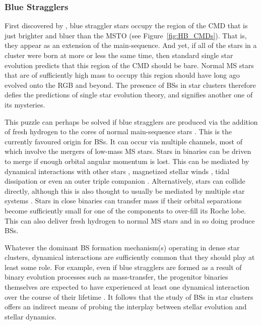\subsubsection{Blue Stragglers} \label{BSs}

First discovered by \citet{sandage53}, blue straggler stars occupy the
region of the CMD that is just brighter and bluer than the MSTO (see
Figure~\ref{fig:HB_CMDs}).  That
is, they appear as an extension of the main-sequence.  And yet, if all
of the stars in a cluster were born at more or less the same time,
then standard single star evolution predicts that this region
of the CMD should be bare.  Normal MS stars that are of sufficiently
high mass to occupy this region should have long ago evolved onto the
RGB and beyond.  The presence of BSs in star clusters therefore
defies the predictions of single star evolution theory, and signifies 
another one of its mysteries.

This puzzle can perhaps be solved if blue stragglers are produced 
via the addition of fresh hydrogen to the cores of normal 
main-sequence stars \citep[e.g.][]{sills01}.  This is the
currently favoured origin for BSs.  It can occur
via multiple channels, most of which involve the mergers of low-mass
MS stars.  Stars in binaries can be driven to merge if enough orbital
angular momentum is lost.  This can be
mediated by dynamical interactions with other stars
\citep[e.g.][]{leonard89, leonard92}, magnetized
stellar winds \citep[e.g.][]{ivanova03}, tidal dissipation
\citep[e.g.][]{cleary90, chen08b} or even an outer triple companion
\citep[e.g.][]{fabrycky07, perets09}.  Alternatively, stars
can collide directly, although this is also thought to usually be
mediated by multiple star systems \citep{leonard89}.  Stars in close
binaries
can transfer mass if their orbital separations become sufficiently
small for one of the components to over-fill its Roche lobe.  This 
can also deliver fresh hydrogen to normal MS stars and in so doing
produce BSs.  

Whatever the
dominant BS formation mechanism(s) operating in dense star clusters,
dynamical interactions are sufficiently common that they should play
at least some role.  For example,
even if blue stragglers are formed as a result of binary evolution
processes such as mass-transfer, the progenitor binaries themselves
are expected to have experienced at least one dynamical interaction
over the course of their lifetime \citep[e.g.][]{hut83b, leonard89,
  davies04}.  
It follows that the study of BSs in star clusters offers an indirect 
means of probing the interplay between stellar evolution and stellar
dynamics. 

